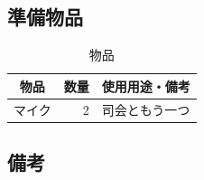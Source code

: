 \subsection{準備物品}
\begin{table}[h]
  \centering
  \caption{物品}
  \begin{tabular}{lrl}
    \hline
    \multicolumn{1}{c}{物品} & \multicolumn{1}{c}{数量} & \multicolumn{1}{c}{使用用途・備考} \\
    \hline
    マイク & 2 & 司会ともう一つ \\
    \hline  
  \end{tabular}
\end{table}

\subsection{備考}
